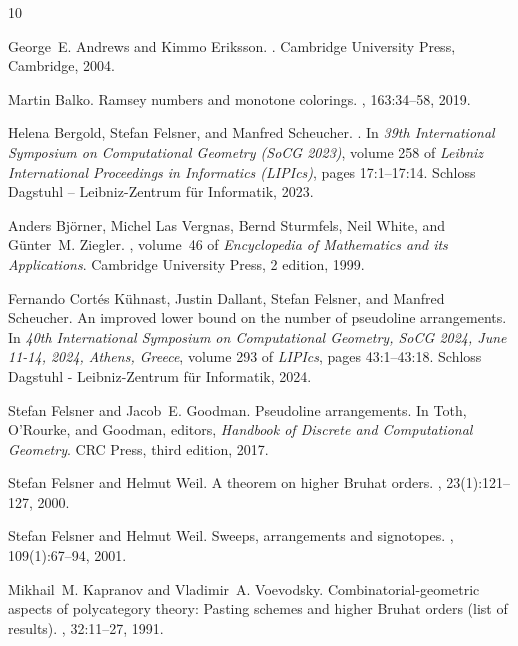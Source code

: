 \documentclass[a4paper,11pt]{amsart}
\begin{document}
\begin{thebibliography}{10}

George~E. Andrews and Kimmo Eriksson.
.
\newblock Cambridge University Press, Cambridge, 2004.

Martin Balko.
\newblock Ramsey numbers and monotone colorings.
, 163:34--58, 2019.

Helena Bergold, Stefan Felsner, and Manfred Scheucher.
.
\newblock In {\em 39th International Symposium on Computational Geometry (SoCG
  2023)}, volume 258 of {\em Leibniz International Proceedings in Informatics
  (LIPIcs)}, pages 17:1--17:14. Schloss Dagstuhl -- Leibniz-Zentrum f{\"u}r
  Informatik, 2023.

Anders Bj{\"o}rner, Michel {Las Vergnas}, Bernd Sturmfels, Neil White, and
  G{\"u}nter~M. Ziegler.
, volume~46 of {\em Encyclopedia of
  Mathematics and its Applications}.
\newblock Cambridge University Press, 2 edition, 1999.

Fernando {Cort{\'{e}}s K{\"{u}}hnast}, Justin Dallant, Stefan Felsner, and
  Manfred Scheucher.
\newblock An improved lower bound on the number of pseudoline arrangements.
\newblock In {\em 40th International Symposium on Computational Geometry, SoCG
  2024, June 11-14, 2024, Athens, Greece}, volume 293 of {\em LIPIcs}, pages
  43:1--43:18. Schloss Dagstuhl - Leibniz-Zentrum f{\"{u}}r Informatik, 2024.

Stefan Felsner and Jacob~E. Goodman.
\newblock Pseudoline arrangements.
\newblock In Toth, O'Rourke, and Goodman, editors, {\em Handbook of Discrete
  and Computational Geometry}. CRC Press, third edition, 2017.

Stefan Felsner and Helmut Weil.
\newblock A theorem on higher {B}ruhat orders.
, 23(1):121--127, 2000.

Stefan Felsner and Helmut Weil.
\newblock Sweeps, arrangements and signotopes.
, 109(1):67--94, 2001.

Mikhail~M. Kapranov and Vladimir~A. Voevodsky.
\newblock Combinatorial-geometric aspects of polycategory theory: {Pasting}
  schemes and higher {Bruhat} orders (list of results).
, 32:11--27, 1991.


\end{thebibliography}
\end{document}
